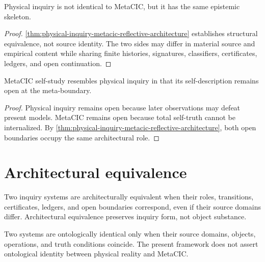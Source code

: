 \begin{corollary}
\label{cor:physical-inquiry-metacic-like-form}
Physical inquiry is not identical to MetaCIC, but it has the same epistemic skeleton.
\end{corollary}

\begin{proof}
\autoref{thm:physical-inquiry-metacic-reflective-architecture} establishes structural equivalence, not source identity. The two sides may differ in material source and empirical content while sharing finite histories, signatures, classifiers, certificates, ledgers, and open continuation.
\end{proof}

\begin{corollary}
\label{cor:metacic-self-study-physics-like-openness}
MetaCIC self-study resembles physical inquiry in that its self-description remains open at the meta-boundary.
\end{corollary}

\begin{proof}
Physical inquiry remains open because later observations may defeat present models. MetaCIC remains open because total self-truth cannot be internalized. By \autoref{thm:physical-inquiry-metacic-reflective-architecture}, both open boundaries occupy the same architectural role.
\end{proof}

\section{Architectural equivalence}
\label{sec:architectural-equivalence}

\begin{definition}
\label{def:architectural-equivalence}
Two inquiry systems are architecturally equivalent when their roles, transitions, certificates, ledgers, and open boundaries correspond, even if their source domains differ. Architectural equivalence preserves inquiry form, not object substance.
\end{definition}

\begin{definition}
\label{def:ontological-identity}
Two systems are ontologically identical only when their source domains, objects, operations, and truth conditions coincide. The present framework does not assert ontological identity between physical reality and MetaCIC.
\end{definition}


